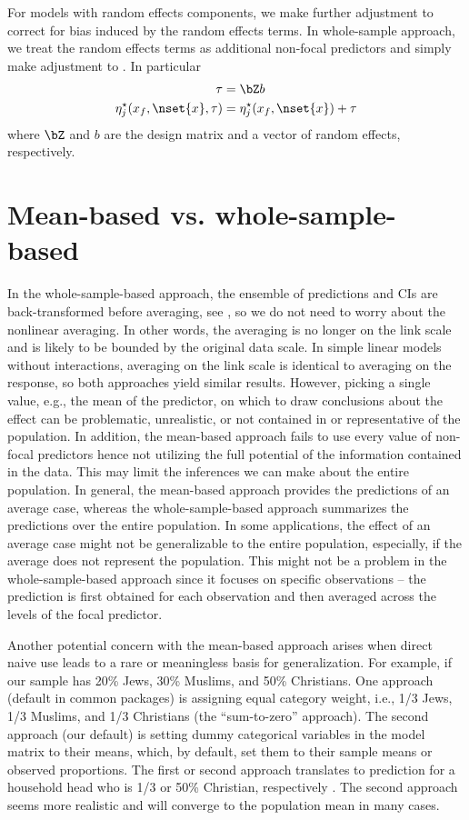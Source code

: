 For models with random effects components, we make further adjustment to correct for bias induced by the random effects terms. In whole-sample approach, we treat the random effects terms as additional non-focal predictors and simply make adjustment to . In particular
%
\begin{align}\label{eq:pop_eta_re} 
\tau &= \bZ b \nonumber \\
\eta_j^\star(x_f, \nset{x}, \tau)  &= \eta_j^\star(x_f, \nset{x}) + \tau
\end{align}
where $\bZ$ and $b$ are the design matrix and a vector of random effects, respectively.

\section{Mean-based vs. whole-sample-based}

In the whole-sample-based approach, the ensemble of predictions and CIs are back-transformed before averaging, see , so we do not need to worry about the nonlinear averaging. In other words, the averaging is no longer on the link scale and is likely to be bounded by the original data scale. In simple linear models without interactions, averaging on the link scale is identical to averaging on the response, so both approaches yield similar results. However, picking a single value, e.g., the mean of the predictor, on which to draw conclusions about the effect can be problematic, unrealistic, or not contained in or representative of the population. In addition, the mean-based approach fails to use every value of non-focal predictors hence not utilizing the full potential of the information contained in the data. This may limit the inferences we can make about the entire population. In general, the mean-based approach provides the predictions of an average case, whereas the whole-sample-based approach summarizes the predictions over the entire population. In some applications, the effect of an average case might not be generalizable to the entire population, especially, if the average does not represent the population. This might not be a problem in the whole-sample-based approach since it focuses on specific observations -- the prediction is first obtained for each observation and then averaged across the levels of the focal predictor.

Another potential concern with the mean-based approach arises when direct naive use leads to a rare or meaningless basis for generalization. For example, if our sample has 20\% Jews, 30\% Muslims, and 50\% Christians. One approach (default in common packages) is assigning equal category weight, i.e., 1/3 Jews, 1/3 Muslims, and 1/3 Christians (the ``sum-to-zero'' approach). The second approach (our default) is setting dummy categorical variables in the model matrix to their means, which, by default, set them to their sample means or observed proportions. The first or second approach translates to prediction for a household head who is 1/3 or 50\% Christian, respectively \citep{hanmer2013behind}. The second approach seems more realistic and will converge to the population mean in many cases.

